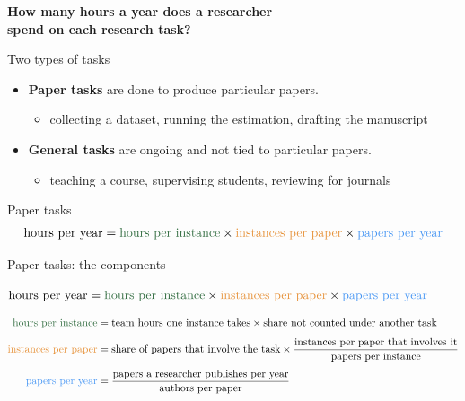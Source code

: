 \documentclass[aspectratio=169,11pt]{beamer}
\newcommand{\HI}[1]{{\color{lagreen}#1}}        %
\newcommand{\IN}[1]{{\color{laorange}#1}}       %
\newcommand{\PY}[1]{{\color{lalightblue}#1}}    %
\newcommand{\tx}[1]{\text{#1}}
\begin{document}
{
\begin{frame}
\vfill
\begin{center}
{\LARGE\bfseries How many hours a year does a researcher\\[0.3em] spend on each research task?}
\end{center}
\vfill
\end{frame}}
\addtocounter{framenumber}{-1}

\begin{frame}{Two types of tasks}
\vfill
\begin{itemize}\setlength\itemsep{1.2em}
  \item \textbf{Paper tasks} are done to produce particular papers.
  \begin{itemize}
    \item collecting a dataset, running the estimation, drafting the manuscript
  \end{itemize}
  \item \textbf{General tasks} are ongoing and not tied to particular papers.
  \begin{itemize}
    \item teaching a course, supervising students, reviewing for journals
  \end{itemize}
\end{itemize}
\vfill
\end{frame}

\begin{frame}{Paper tasks}
\vfill
{\large
\[
\tx{hours per year} = \HI{\tx{hours per instance}} \times \IN{\tx{instances per paper}} \times \PY{\tx{papers per year}}
\]}
\vfill
\end{frame}

\begin{frame}{Paper tasks: the components}
\vfill
\begin{center}
$\tx{hours per year} = \HI{\tx{hours per instance}} \times \IN{\tx{instances per paper}} \times \PY{\tx{papers per year}}$
\end{center}
\vspace{0.6em}
\small
\begin{align*}
\HI{\tx{hours per instance}} &= \tx{team hours one instance takes} \times \tx{share not counted under another task}\\[0.4em]
\IN{\tx{instances per paper}} &= \tx{share of papers that involve the task} \times
  \frac{\tx{instances per paper that involves it}}{\tx{papers per instance}}\\[0.4em]
\PY{\tx{papers per year}} &= \frac{\tx{papers a researcher publishes per year}}{\tx{authors per paper}}
\end{align*}
\vfill
\end{frame}
\end{document}
